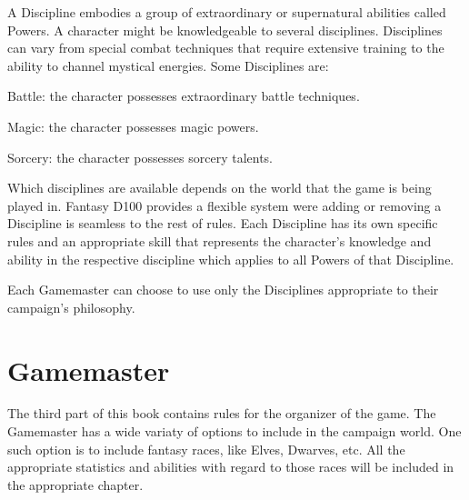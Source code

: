 A Discipline embodies a group of extraordinary or supernatural abilities called Powers. A character might be knowledgeable to several disciplines. Disciplines can vary from special combat techniques that require extensive training to the ability to channel mystical energies. Some Disciplines are:
\begin{rpg-list}
\item Battle: the character possesses extraordinary battle techniques.
\item Magic: the character possesses magic powers.
\item Sorcery: the character possesses sorcery talents.
\end{rpg-list}

Which disciplines are available depends on the world that the game is being played in. Fantasy D100 provides a flexible system were adding or removing a Discipline is seamless to the rest of rules. Each Discipline has its own specific rules and an appropriate skill that represents the character's knowledge and ability in the respective discipline which applies to all Powers of that Discipline.

Each Gamemaster can choose to use only the Disciplines appropriate to their campaign's philosophy.


\section{Gamemaster}
The third part of this book contains rules for the organizer of the game. The Gamemaster has a wide variaty of options to include in the campaign world. One such option is to include fantasy races, like Elves, Dwarves, etc. All the appropriate statistics and abilities with regard to those races will be included in the appropriate chapter.


